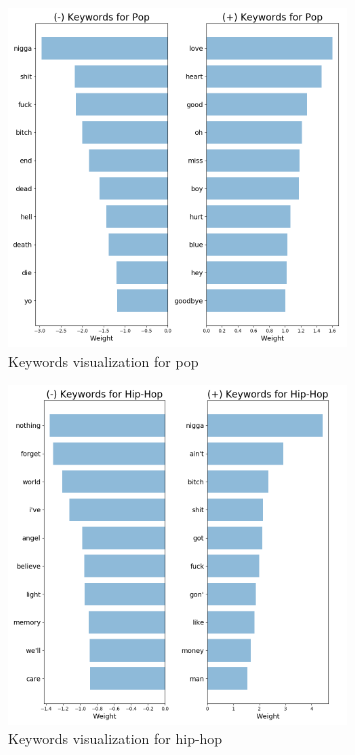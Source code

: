 \documentclass[a4paper,11pt]{article}
\begin{document}
\begin{figure}[h]
\begin{center}
\includegraphics[width=0.8\textwidth]{./img/pop-keywords.png}
\end{center}
\caption{Keywords visualization for pop}
\label{report}
\end{figure}

\begin{figure}[h]
\begin{center}
\includegraphics[width=0.8\textwidth]{./img/hip-hop-keywords.png}
\end{center}
\caption{Keywords visualization for hip-hop}
\label{report}
\end{figure}
\end{document}
